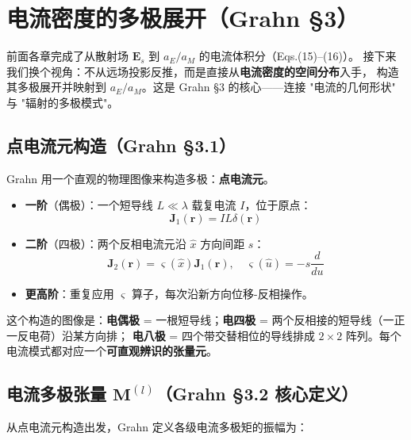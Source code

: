 \section{电流密度的多极展开（Grahn §3）}

前面各章完成了从散射场 $\mathbf{E}_s$ 到 $a_E/a_M$ 的电流体积分（Eqs.(15)--(16)）。
接下来我们换个视角：不从远场投影反推，而是直接从\textbf{电流密度的空间分布}入手，
构造其多极展开并映射到 $a_E/a_M$。这是 Grahn §3 的核心——连接 "电流的几何形状" 与 "辐射的多极模式"。

\subsection{点电流元构造（Grahn §3.1）}

Grahn 用一个直观的物理图像来构造多极：\textbf{点电流元}。

\begin{itemize}
  \item \textbf{一阶}（偶极）：一个短导线 $L\ll\lambda$ 载复电流 $I$，位于原点：
    \begin{equation}
      \mathbf{J}_1(\mathbf{r}) = IL\delta(\mathbf{r})
    \end{equation}
  \item \textbf{二阶}（四极）：两个反相电流元沿 $\hat{x}$ 方向间距 $s$：
    \begin{equation}
      \mathbf{J}_2(\mathbf{r}) = \varsigma(\hat{x})\mathbf{J}_1(\mathbf{r}),\quad
      \varsigma(\hat{u}) = -s\frac{d}{du}
    \end{equation}
  \item \textbf{更高阶}：重复应用 $\varsigma$ 算子，每次沿新方向位移-反相操作。
\end{itemize}

\begin{noteworthy}
这个构造的图像是：\textbf{电偶极} = 一根短导线；\textbf{电四极} = 两个反相接的短导线（一正一反电荷）沿某方向排；
\textbf{电八极} = 四个带交替相位的导线排成 $2\times2$ 阵列。每个电流模式都对应一个\textbf{可直观辨识的张量元}。
\end{noteworthy}

\subsection{电流多极张量 $\mathbf{M}^{(l)}$（Grahn §3.2 核心定义）}

从点电流元构造出发，Grahn 定义各级电流多极矩的振幅为：

